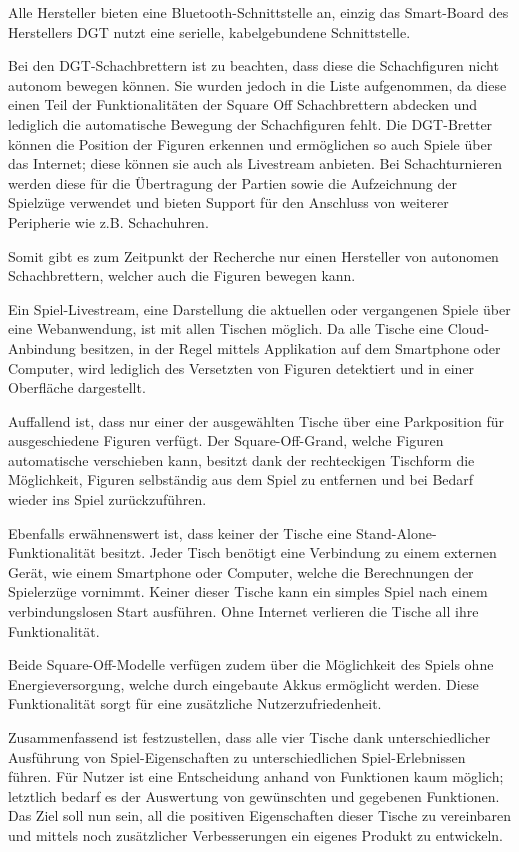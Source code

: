 Alle Hersteller bieten eine Bluetooth-Schnittstelle an, einzig das
Smart-Board des Herstellers DGT nutzt eine serielle, kabelgebundene
Schnittstelle.

Bei den DGT-Schachbrettern ist zu beachten, dass diese die Schachfiguren
nicht autonom bewegen können. Sie wurden jedoch in die Liste
aufgenommen, da diese einen Teil der Funktionalitäten der Square Off
Schachbrettern abdecken und lediglich die automatische Bewegung der
Schachfiguren fehlt. Die DGT-Bretter können die Position der Figuren
erkennen und ermöglichen so auch Spiele über das Internet; diese können
sie auch als Livestream anbieten. Bei Schachturnieren werden diese für
die Übertragung der Partien sowie die Aufzeichnung der Spielzüge
verwendet und bieten Support für den Anschluss von weiterer Peripherie
wie z.B. Schachuhren.

Somit gibt es zum Zeitpunkt der Recherche nur einen Hersteller von
autonomen Schachbrettern, welcher auch die Figuren bewegen kann.

Ein Spiel-Livestream, eine Darstellung die aktuellen oder vergangenen
Spiele über eine Webanwendung, ist mit allen Tischen möglich. Da alle
Tische eine Cloud-Anbindung besitzen, in der Regel mittels Applikation
auf dem Smartphone oder Computer, wird lediglich des Versetzten von
Figuren detektiert und in einer Oberfläche dargestellt.

Auffallend ist, dass nur einer der ausgewählten Tische über eine
Parkposition für ausgeschiedene Figuren verfügt. Der Square-Off-Grand,
welche Figuren automatische verschieben kann, besitzt dank der
rechteckigen Tischform die Möglichkeit, Figuren selbständig aus dem
Spiel zu entfernen und bei Bedarf wieder ins Spiel zurückzuführen.

Ebenfalls erwähnenswert ist, dass keiner der Tische eine
Stand-Alone-Funktionalität besitzt. Jeder Tisch benötigt eine Verbindung
zu einem externen Gerät, wie einem Smartphone oder Computer, welche die
Berechnungen der Spielerzüge vornimmt. Keiner dieser Tische kann ein
simples Spiel nach einem verbindungslosen Start ausführen. Ohne Internet
verlieren die Tische all ihre Funktionalität.

Beide Square-Off-Modelle verfügen zudem über die Möglichkeit des Spiels
ohne Energieversorgung, welche durch eingebaute Akkus ermöglicht werden.
Diese Funktionalität sorgt für eine zusätzliche Nutzerzufriedenheit.

Zusammenfassend ist festzustellen, dass alle vier Tische dank
unterschiedlicher Ausführung von Spiel-Eigenschaften zu
unterschiedlichen Spiel-Erlebnissen führen. Für Nutzer ist eine
Entscheidung anhand von Funktionen kaum möglich; letztlich bedarf es der
Auswertung von gewünschten und gegebenen Funktionen. Das Ziel soll nun
sein, all die positiven Eigenschaften dieser Tische zu vereinbaren und
mittels noch zusätzlicher Verbesserungen ein eigenes Produkt zu
entwickeln.

